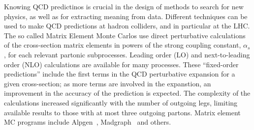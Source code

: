Knowing QCD predictinos is crucial in the design of methods to search for new physics, as well as for extracting meaning from data. Different techniques can be used to make QCD predictions at hadron colliders, and in particular at the LHC. The so called Matrix Element Monte Carlos use direct perturbative calculations of the cross-section matrix elements in powers of the strong coupling constant, $\alpha_s$, for each relevant partonic subprocesses. Leading order (LO) and next-to-leading order (NLO) calculations are available for many processes.   These ``fixed-order predictions'' include the first terms in the QCD perturbative expansion for a given cross-section; as more terms are involved in the expanstion, an improvement in the accuracy of the prediction is expected.  The complexity of the calculations increased significantly with the number of outgoing legs, limiting available results to those with at most three outgoing partons. Matrix element MC programs include {\sc Alpgen}~\cite{ALPGEN}, {\sc Madgraph}~\cite{MADGRAPH} and others.



